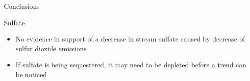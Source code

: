 
		\begin{frame}{Conclusions}
			\begin{block}{Sulfate}
				\begin{itemize}
					\item No evidence in support of  a decrease in stream sulfate caused by decrease of sulfur dioxide emissions
					\item If sulfate is being sequestered, it may need to be depleted before a trend can be noticed
				\end{itemize}	
			\end{block}
		\end{frame}